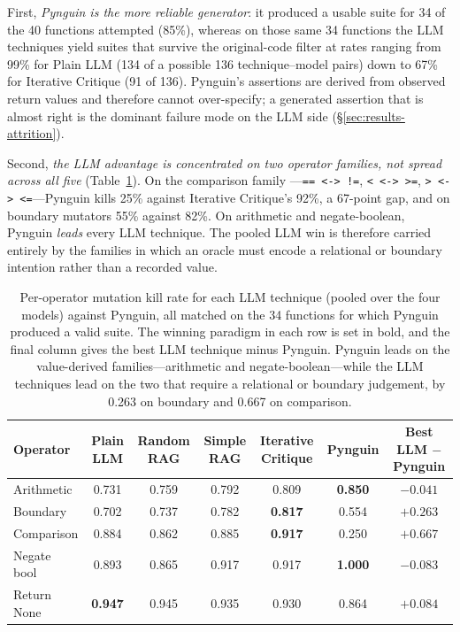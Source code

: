 \documentclass[smallextended]{svjour3}
\begin{document}
First, \emph{Pynguin is the more reliable generator}: it produced a
usable suite for 34 of the 40 functions attempted (85\%), whereas on
those same 34 functions the LLM techniques yield suites that survive
the original-code filter at rates ranging from 99\% for Plain LLM
(134 of a possible 136 technique--model pairs) down to 67\% for
Iterative Critique (91 of 136). Pynguin's assertions are derived from
observed return values and therefore cannot over-specify; a
generated assertion that is almost right is the dominant failure mode
on the LLM side (\S\ref{sec:results-attrition}).

Second, \emph{the LLM advantage is concentrated on two operator
families, not spread across all five}
(Table~\ref{tab:pynguin-peroperator}). On the comparison family
---\verb|== <-> !=|, \verb|< <-> >=|, \verb|> <-> <=|---Pynguin kills
25\% against Iterative Critique's 92\%, a 67-point gap, and on
boundary mutators 55\% against 82\%. On arithmetic and
negate-boolean, Pynguin \emph{leads} every LLM technique. The pooled
LLM win is therefore carried entirely by the families in which an
oracle must encode a relational or boundary intention rather than a
recorded value.

\begin{table}[htbp]
\centering
\caption{Per-operator mutation kill rate for each LLM technique
(pooled over the four models) against Pynguin, all matched on the 34
functions for which Pynguin produced a valid suite. The winning
paradigm in each row is set in bold, and the final column gives the
best LLM technique minus Pynguin. Pynguin leads on the value-derived
families---arithmetic and negate-boolean---while the LLM techniques
lead on the two that require a relational or boundary judgement,
by 0.263 on boundary and 0.667 on comparison.}
\label{tab:pynguin-peroperator}
\setlength{\tabcolsep}{4pt}
\begin{tabular}{@{}lcccccc@{}}
\toprule
Operator & Plain LLM & Random RAG & Simple RAG & Iterative Critique & Pynguin & Best LLM $-$ Pynguin \\
\midrule
Arithmetic & 0.731 & 0.759 & 0.792 & 0.809 & \textbf{0.850} & $-0.041$ \\
Boundary & 0.702 & 0.737 & 0.782 & \textbf{0.817} & 0.554 & $+0.263$ \\
Comparison & 0.884 & 0.862 & 0.885 & \textbf{0.917} & 0.250 & $+0.667$ \\
Negate bool & 0.893 & 0.865 & 0.917 & 0.917 & \textbf{1.000} & $-0.083$ \\
Return None & \textbf{0.947} & 0.945 & 0.935 & 0.930 & 0.864 & $+0.084$ \\
\bottomrule
\end{tabular}
\end{table}
\end{document}
